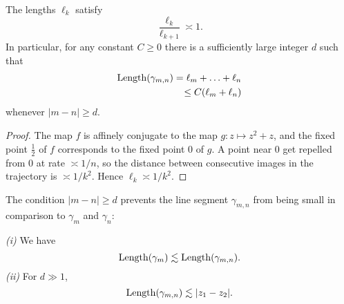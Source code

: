 \begin{lemma} \label{lem-ell_n}
	The lengths ${\ell_k}$ satisfy
	\begin{equation}
		\frac{\ell_k}{\ell_{k+1}} \asymp 1.
	\end{equation}
	In particular, for any constant $C \geq 0$ there is a sufficiently large integer $d$ such that
	\begin{align*}
		\operatorname{Length}(\gamma_{m,n}) = \ell_{m}+\ldots+\ell_{n} \\ \leq C (\ell_m+\ell_n)
	\end{align*}
	whenever $|m-n| \geq d$.
\end{lemma}
\begin{proof} \leavevmode
	The map $f$ is affinely conjugate to the map $g: z\mapsto z^2+z$, and the fixed point $\frac 12$ of $f$ corresponds to the fixed point $0$ of $g$. A point near $0$ get repelled from $0$ at rate $\asymp 1/n$, so the distance between consecutive images in the trajectory is $\asymp  1/{k^2}$. Hence $\ell_k \asymp 1/{k^2}$.
\end{proof}

%

The condition $|m-n| \geq d$ prevents the line segment $\gamma _{m,n}$ from being small in comparison to $\gamma_m$ and $\gamma_n$:
\begin{proposition} \leavevmode
	\emph{(i)} We have \begin{equation}
		\operatorname{Length}(\gamma_m) \lesssim \operatorname{Length}(\gamma_{m,n}).
	\end{equation}
	\emph{(ii)} For $d \gg 1$, 
	\begin{equation}
		\operatorname{Length}(\gamma_{m,n}) \lesssim |z_1-z_2|.
	\end{equation}
\end{proposition}


